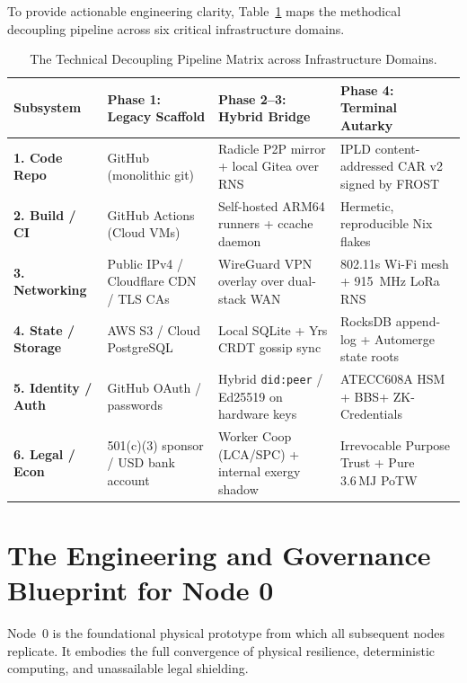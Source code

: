 To provide actionable engineering clarity, Table~\ref{tab:decoupling_pipeline} maps the methodical decoupling pipeline across six critical infrastructure domains.

\begin{table}[htbp]
\centering
\small
\setlength{\tabcolsep}{3.5pt}
\begin{tabular}{|p{}|p{}|p{}|p{}|}
\hline
\textbf{Subsystem} & \textbf{Phase 1: Legacy Scaffold} & \textbf{Phase 2--3: Hybrid Bridge} & \textbf{Phase 4: Terminal Autarky} \\
\hline
\textbf{1. Code Repo} & GitHub (monolithic git) & Radicle P2P mirror + local Gitea over RNS & IPLD content-addressed CAR v2 signed by FROST \\
\hline
\textbf{2. Build / CI} & GitHub Actions (Cloud VMs) & Self-hosted ARM64 runners + ccache daemon & Hermetic, reproducible Nix flakes \\
\hline
\textbf{3. Networking} & Public IPv4 / Cloudflare CDN / TLS CAs & WireGuard VPN overlay over dual-stack WAN & 802.11s Wi-Fi mesh + 915~MHz LoRa RNS \\
\hline
\textbf{4. State / Storage} & AWS S3 / Cloud PostgreSQL & Local SQLite + Yrs CRDT gossip sync & RocksDB append-log + Automerge state roots \\
\hline
\textbf{5. Identity / Auth} & GitHub OAuth / passwords & Hybrid \texttt{did:peer} / Ed25519 on hardware keys & ATECC608A HSM + BBS+ ZK-Credentials \\
\hline
\textbf{6. Legal / Econ} & 501(c)(3) sponsor / USD bank account & Worker Coop (LCA/SPC) + internal exergy shadow & Irrevocable Purpose Trust + Pure $3.6\,\mathrm{MJ}$ PoTW \\
\hline
\end{tabular}
\caption{The Technical Decoupling Pipeline Matrix across Infrastructure Domains.}
\label{tab:decoupling_pipeline}
\end{table}

\section{The Engineering and Governance Blueprint for Node 0}
\label{sec:node0_blueprint}

Node~0 is the foundational physical prototype from which all subsequent nodes replicate. It embodies the full convergence of physical resilience, deterministic computing, and unassailable legal shielding.


